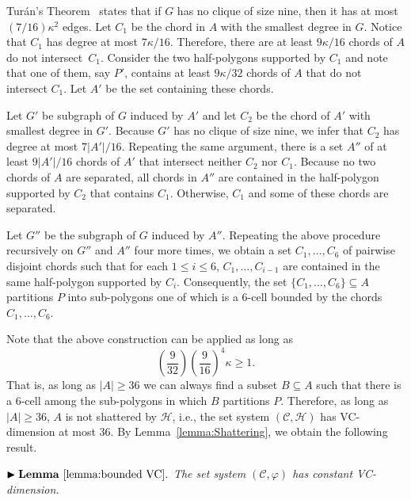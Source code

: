 \documentclass[a4paper,UKenglish]{lipics}
\begin{document}
Tur\'an's Theorem~\cite{turan1941extremal} states that if $G$ has no clique of size nine, then it has at most $(7/16)\kappa^2$ edges.
Let $C_1$ be the chord in $A$ with the smallest degree in $G$. Notice that $C_1$ has degree at most $7 \kappa/16$.
Therefore, there are at least $9 \kappa/16$ chords of $A$ do not intersect~$C_1$. 
Consider the two half-polygons supported by $C_1$ and note that one of them, say $P'$, contains at least $9 \kappa/32$ chords of $A$ that do not intersect $C_1$. Let $A'$ be the set containing these chords.

Let $G'$ be subgraph of $G$ induced by $A'$ and let $C_2$ be the chord of $A'$ with smallest degree in $G'$.
Because $G'$ has no clique of size nine, we infer that $C_2$ has degree at most $7|A'|/16$.
Repeating the same argument, there is a set $A''$ of at least $9 |A'| /16$ chords of $A'$ that intersect neither $C_2$ nor $C_1$.
Because no two chords of $A$ are separated, all chords in $A''$ are contained in the half-polygon supported by $C_2$ that contains $C_1$. Otherwise, $C_1$ and some of these chords are separated.

Let $G''$ be the subgraph of $G$ induced by $A''$. Repeating the above procedure recursively on $G''$ and $A''$ four more times, we obtain a set $C_1, \ldots, C_6$ of pairwise disjoint chords such that for each $1\leq i\leq 6$, $C_1, \ldots, C_{i-1}$ are contained in the same half-polygon supported by $C_i$.
Consequently, the set $\{C_1, \ldots, C_6\}\subseteq A$ partitions $P$ into sub-polygons one of which is a 6-cell bounded by the chords $C_1, \ldots, C_6$.

Note that the above construction can be applied as long as 
$$\left(\frac{9}{32}\right) \left(\frac{9}{16}\right)^4\kappa \geq 1.$$ 
That is, as long as $|A| \geq 36$ we can always find a subset $B\subseteq A$ such that there is a $6$-cell among the sub-polygons in which $B$ partitions $P$. 
Therefore, as long as $|A| \geq 36$, $A$ is not shattered by $\mathcal H$, i.e., the set system $(\mathcal C, \mathcal H)$ has VC-dimension at most 36.
By Lemma~\ref{lemma:Shattering}, we obtain the following result.

\vspace{.1in}
\noindent $\blacktriangleright \mathbf{Lemma~\ref{lemma:bounded VC}.}$ 
\emph{The set system $(\mathcal C, \varphi)$ has constant VC-dimension.
}
\end{document}
